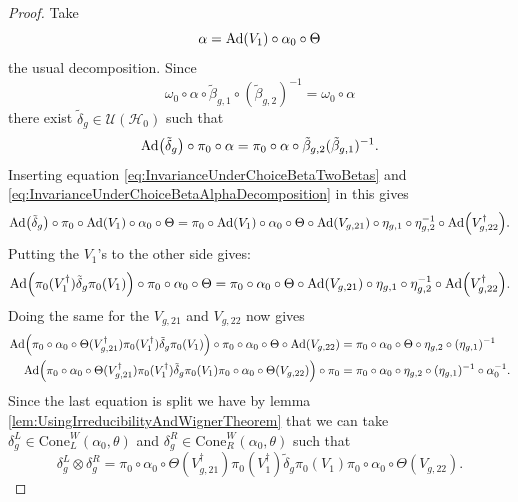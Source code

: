 \documentclass[12pt,a4paper,twoside]{article}
\let\originalleft\left
\let\originalright\right
\renewcommand{\left}{\mathopen{}\mathclose\bgroup\originalleft}
\renewcommand{\right}{\aftergroup\egroup\originalright}
\newcommand{\UU}{\mathcal U}
\newcommand{\HH}{\mathcal H}
\newcommand{\Ad}[1]{\textrm{Ad}\left(#1\right)}
\theoremstyle{definition}
\numberwithin{equation}{section}
\begin{document}
\begin{proof}
	Take 
	\begin{equation}\label{eq:InvarianceUnderChoiceBetaAlphaDecomposition}
		\alpha=\Ad{V_1}\circ\alpha_{0}\circ\Theta
	\end{equation}
	the usual decomposition. Since
	\begin{equation}
		\omega_0\circ\alpha\circ\tilde{\beta}_{g,1}\circ(\tilde{\beta}_{g,2})^{-1}=\omega_0\circ\alpha
	\end{equation}
	there exist $\tilde{\delta}_g\in\UU(\HH_0)$ such that
	\begin{equation}
		\Ad{\tilde{\delta}_g}\circ\pi_0\circ\alpha=\pi_0\circ\alpha\circ\tilde{\beta}_{g,2}(\tilde{\beta}_{g,1})^{-1}.
	\end{equation}
	Inserting equation \eqref{eq:InvarianceUnderChoiceBetaTwoBetas} and \eqref{eq:InvarianceUnderChoiceBetaAlphaDecomposition} in this gives
	\begin{equation}
		\Ad{\tilde{\delta}_g}\circ\pi_0\circ\Ad{V_1}\circ\alpha_0\circ\Theta=\pi_0\circ\Ad{V_1}\circ\alpha_0\circ\Theta\circ\Ad{V_{g,21}}\circ\eta_{g,1}\circ\eta_{g,2}^{-1}\circ\Ad{V_{g,22}^\dagger}.
	\end{equation}
	Putting the $V_1$'s to the other side gives:
	\begin{equation}
		\Ad{\pi_0(V_1^\dagger) \tilde{\delta}_g\pi_0(V_1)}\circ\pi_0\circ\alpha_0\circ\Theta=\pi_0\circ\alpha_0\circ\Theta\circ\Ad{V_{g,21}}\circ\eta_{g,1}\circ\eta_{g,2}^{-1}\circ\Ad{V_{g,22}^\dagger}.
	\end{equation}
	Doing the same for the $V_{g,21}$ and $V_{g,22}$ now gives
	\begin{align}
		\Ad{\pi_0\circ\alpha_0\circ\Theta(V_{g,21}^\dagger)\pi_0(V_1^\dagger)\tilde{\delta}_g\pi_0(V_1)}\circ\pi_0\circ\alpha_0\circ\Theta\circ\Ad{V_{g,22}}&=\pi_0\circ\alpha_0\circ\Theta\circ\eta_{g,2}\circ(\eta_{g,1})^{-1}\\
		\Ad{\pi_0\circ\alpha_0\circ\Theta(V_{g,21}^\dagger)\pi_0(V_1^\dagger)\tilde{\delta}_g\pi_0(V_1)\pi_0\circ\alpha_0\circ\Theta(V_{g,22})}\circ\pi_0&=\pi_0\circ\alpha_0\circ\eta_{g,2}\circ(\eta_{g,1})^{-1}\circ\alpha_0^{-1}.
	\end{align}
	Since the last equation is split we have by lemma \ref{lem:UsingIrreducibilityAndWignerTheorem} that we can take $\delta_g^L\in\textrm{Cone}_L^W(\alpha_0,\theta)$ and $\delta_g^R\in\textrm{Cone}_R^W(\alpha_0,\theta)$ such that
	\begin{equation}
		\delta_g^L\otimes\delta_g^R=\pi_0\circ\alpha_0\circ\Theta(V_{g,21}^\dagger)\pi_0(V_1^\dagger)\tilde{\delta}_g\pi_0(V_1)\pi_0\circ\alpha_0\circ\Theta(V_{g,22}).

\end{equation}
\end{proof}
\end{document}

